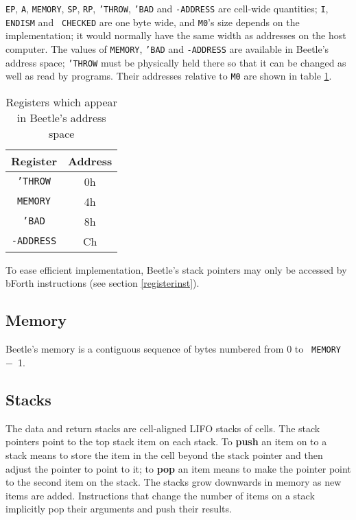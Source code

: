{\tt EP}, {\tt A}, {\tt MEMORY}, {\tt SP}, {\tt RP}, {\tt 'THROW}, {\tt 'BAD}
and {\tt -ADDRESS} are cell-wide quantities; {\tt I}, {\tt ENDISM} and {\tt
CHECKED} are one byte wide, and {\tt M0}'s size depends on the implementation;
it would normally have the same width as addresses on the host computer. The
values of {\tt MEMORY}, {\tt 'BAD} and {\tt -ADDRESS} are available in Beetle's
address space; {\tt 'THROW} must be physically held there so that it can be
changed as well as read by programs. Their addresses relative to {\tt M0} are
shown in table \ref{mappedtable}.

\begin{table}[htbp]
\begin{center}
\begin{tabular}{|c|c|} \hline
\rule[-2mm]{0mm}{6mm}\bf Register & \bf Address \\ \hline
{\tt 'THROW} & 0h \\
{\tt MEMORY} & 4h \\
{\tt 'BAD} & 8h \\
{\tt -ADDRESS} & Ch \\ \hline
\end{tabular}
\end{center}
\vspace{-2mm}
\caption{\label{mappedtable}Registers which appear in Beetle's address
    space}
\end{table}

To ease efficient implementation, Beetle's stack pointers may only be accessed
by bForth instructions (see section \ref{registerinst}).


\subsection{Memory}

Beetle's memory is a contiguous sequence of bytes numbered from 0 to {\tt
MEMORY}~$-$~1.


\subsection{Stacks}

The data and return stacks are cell-aligned LIFO stacks of cells. The stack
pointers point to the top stack item on each stack. To {\bf push} an item on to
a stack means to store the item in the cell beyond the stack pointer and then
adjust the pointer to point to it; to {\bf pop} an item means to make the
pointer point to the second item on the stack. The stacks grow downwards in
memory as new items are added. Instructions that change the number of items on a
stack implicitly pop their arguments and push their results.

